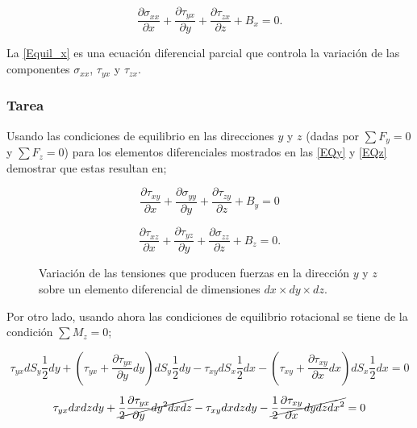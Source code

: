 \documentclass[../notas medios.tex]{subfiles}
\begin{document}
\begin{equation}
\frac{{\partial {\sigma _{xx}}}}{{\partial x}} + \frac{{\partial {\tau _{yx}}}}{{\partial y}} + \frac{{\partial {\tau _{zx}}}}{{\partial z}} + {B_x} = 0.
\label{Equil_x}
\end{equation}

La \cref{Equil_x} es una ecuación diferencial parcial que controla la variación de las componentes ${\sigma _{xx}}$, ${\tau _{yx}}$ y ${\tau _{zx}}$.


\subsubsection{Tarea}
Usando las condiciones de equilibrio en las direcciones $y$ y $z$ (dadas por $\sum {{F_y} = 0}$ y $\sum {{F_z} = 0}$) para los elementos diferenciales mostrados en las \cref{EQy} y \cref{EQz} demostrar que estas resultan en;


\[\frac{{\partial {\tau _{xy}}}}{{\partial x}} + \frac{{\partial {\sigma _{yy}}}}{{\partial y}} + \frac{{\partial {\tau _{zy}}}}{{\partial z}} + {B_y} = 0\]


\[\frac{{\partial {\tau _{xz}}}}{{\partial x}} + \frac{{\partial {\tau _{yz}}}}{{\partial y}} + \frac{{\partial {\sigma _{zz}}}}{{\partial z}} + {B_z} = 0.\]


\begin{figure}[H]
     \centering
     \hspace{0.5cm}
     \caption{Variación de las tensiones que producen fuerzas en la dirección $y$ y $z$ sobre un elemento diferencial de dimensiones $dx \times dy \times dz$.}
     \label{steady_state}
\end{figure}


Por otro lado, usando ahora las condiciones de equilibrio rotacional se tiene de la condición $\sum {{M_z} = 0}$;

\[{\tau _{yx}}d{S_y}\frac{1}{2}dy + \left( {{\tau _{yx}} + \frac{{\partial {\tau _{yx}}}}{{\partial y}}dy} \right)d{S_y}\frac{1}{2}dy - {\tau _{xy}}d{S_x}\frac{1}{2}dx - \left( {{\tau _{xy}} + \frac{{\partial {\tau _{xy}}}}{{\partial x}}dx} \right)d{S_x}\frac{1}{2}dx = 0\]

\[{\tau _{yx}}dxdzdy + \cancel{\frac{1}{2}\frac{{\partial {\tau _{yx}}}}{{\partial y}}d{y^2}dxdz} - {\tau _{xy}}dxdzdy - \cancel{\frac{1}{2}\frac{{\partial {\tau _{xy}}}}{{\partial x}}dydzd{x^2}} = 0\]
\end{document}

